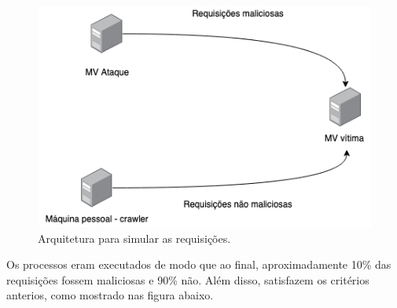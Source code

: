 \begin{figure}
    \centering
    \includegraphics[width=.7\textwidth]{figuras/arquitetura_ataque.png}
    \caption{Arquitetura para simular as requisições. \label{fig:arquitetura_ataque}}    
\end{figure}

Os processos eram executados de modo que ao final, aproximadamente 10\% das requisições 
fossem maliciosas e 90\% não. Além disso, satisfazem os critérios anterios, como mostrado 
nas figura abaixo.

